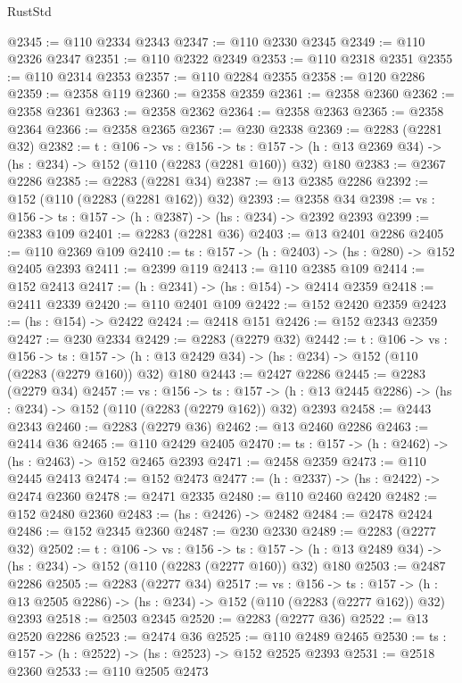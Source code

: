 \begin{lexlean}{RustStd}
\begin{coremodule}
@2345 := @110 @2334 @2343
@2347 := @110 @2330 @2345
@2349 := @110 @2326 @2347
@2351 := @110 @2322 @2349
@2353 := @110 @2318 @2351
@2355 := @110 @2314 @2353
@2357 := @110 @2284 @2355
@2358 := @120 @2286
@2359 := @2358 @119
@2360 := @2358 @2359
@2361 := @2358 @2360
@2362 := @2358 @2361
@2363 := @2358 @2362
@2364 := @2358 @2363
@2365 := @2358 @2364
@2366 := @2358 @2365
@2367 := @230 @2338
@2369 := @2283 (@2281 @32)
@2382 := {t : @106} ->
  {vs : @156} ->
  {ts : @157} -> (h : @13 @2369 @34) -> (hs : @234) -> @152 (@110 (@2283 (@2281 @160)) @32) @180
@2383 := @2367 @2286
@2385 := @2283 (@2281 @34)
@2387 := @13 @2385 @2286
@2392 := @152 (@110 (@2283 (@2281 @162)) @32)
@2393 := @2358 @34
@2398 := {vs : @156} -> {ts : @157} -> (h : @2387) -> (hs : @234) -> @2392 @2393
@2399 := @2383 @109
@2401 := @2283 (@2281 @36)
@2403 := @13 @2401 @2286
@2405 := @110 @2369 @109
@2410 := {ts : @157} -> (h : @2403) -> (hs : @280) -> @152 @2405 @2393
@2411 := @2399 @119
@2413 := @110 @2385 @109
@2414 := @152 @2413
@2417 := (h : @2341) -> (hs : @154) -> @2414 @2359
@2418 := @2411 @2339
@2420 := @110 @2401 @109
@2422 := @152 @2420 @2359
@2423 := (hs : @154) -> @2422
@2424 := @2418 @151
@2426 := @152 @2343 @2359
@2427 := @230 @2334
@2429 := @2283 (@2279 @32)
@2442 := {t : @106} ->
  {vs : @156} ->
  {ts : @157} -> (h : @13 @2429 @34) -> (hs : @234) -> @152 (@110 (@2283 (@2279 @160)) @32) @180
@2443 := @2427 @2286
@2445 := @2283 (@2279 @34)
@2457 := {vs : @156} ->
  {ts : @157} -> (h : @13 @2445 @2286) -> (hs : @234) -> @152 (@110 (@2283 (@2279 @162)) @32) @2393
@2458 := @2443 @2343
@2460 := @2283 (@2279 @36)
@2462 := @13 @2460 @2286
@2463 := @2414 @36
@2465 := @110 @2429 @2405
@2470 := {ts : @157} -> (h : @2462) -> (hs : @2463) -> @152 @2465 @2393
@2471 := @2458 @2359
@2473 := @110 @2445 @2413
@2474 := @152 @2473
@2477 := (h : @2337) -> (hs : @2422) -> @2474 @2360
@2478 := @2471 @2335
@2480 := @110 @2460 @2420
@2482 := @152 @2480 @2360
@2483 := (hs : @2426) -> @2482
@2484 := @2478 @2424
@2486 := @152 @2345 @2360
@2487 := @230 @2330
@2489 := @2283 (@2277 @32)
@2502 := {t : @106} ->
  {vs : @156} ->
  {ts : @157} -> (h : @13 @2489 @34) -> (hs : @234) -> @152 (@110 (@2283 (@2277 @160)) @32) @180
@2503 := @2487 @2286
@2505 := @2283 (@2277 @34)
@2517 := {vs : @156} ->
  {ts : @157} -> (h : @13 @2505 @2286) -> (hs : @234) -> @152 (@110 (@2283 (@2277 @162)) @32) @2393
@2518 := @2503 @2345
@2520 := @2283 (@2277 @36)
@2522 := @13 @2520 @2286
@2523 := @2474 @36
@2525 := @110 @2489 @2465
@2530 := {ts : @157} -> (h : @2522) -> (hs : @2523) -> @152 @2525 @2393
@2531 := @2518 @2360
@2533 := @110 @2505 @2473

\end{coremodule}
\end{lexlean}
